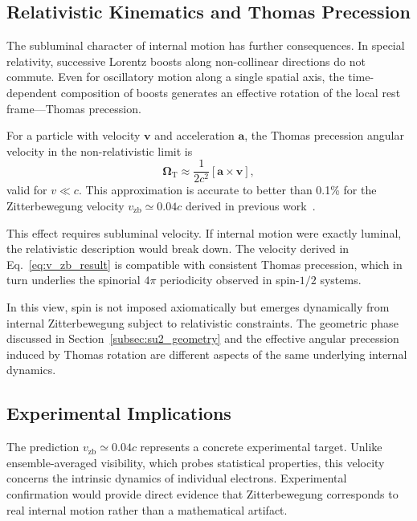 \documentclass[%
 reprint,
 amsmath,amssymb,
 aps,
 prb,
]{revtex4-2}
\numberwithin{equation}{section}
\begin{document}
\subsection{Relativistic Kinematics and Thomas Precession}
\label{subsec:thomas_precession}

The subluminal character of internal motion has further consequences. In special relativity, successive Lorentz boosts along non-collinear directions do not commute. Even for oscillatory motion along a single spatial axis, the time-dependent composition of boosts generates an effective rotation of the local rest frame---Thomas precession.

For a particle with velocity $\mathbf{v}$ and acceleration $\mathbf{a}$, 
the Thomas precession angular velocity in the non-relativistic limit is
\begin{equation}
\boldsymbol{\Omega}_{\mathrm{T}} \approx \frac{1}{2c^2}[\mathbf{a} \times \mathbf{v}],
\label{eq:thomas_formula}
\end{equation}
valid for $v \ll c$. This approximation is accurate to better than 
0.1\% for the Zitterbewegung velocity $v_{\mathrm{zb}} \simeq 0.04c$ 
derived in previous work~\cite{zenodo.16905633}.

This effect requires subluminal velocity. If internal motion were exactly luminal, the relativistic description would break down. The velocity derived in Eq.~\eqref{eq:v_zb_result} is compatible with consistent Thomas precession, which in turn underlies the spinorial $4\pi$ periodicity observed in spin-$1/2$ systems.

In this view, spin is not imposed axiomatically but emerges dynamically from internal Zitterbewegung subject to relativistic constraints. The geometric phase discussed in Section~\ref{subsec:su2_geometry} and the effective angular precession induced by Thomas rotation are different aspects of the same underlying internal dynamics.


\subsection{Experimental Implications}
\label{subsec:experimental_implications}

The prediction $v_{\mathrm{zb}} \simeq 0.04c$ represents a concrete experimental target. Unlike ensemble-averaged visibility, which probes statistical properties, this velocity concerns the intrinsic dynamics of individual electrons. Experimental confirmation would provide direct evidence that Zitterbewegung corresponds to real internal motion rather than a mathematical artifact.
\end{document}
